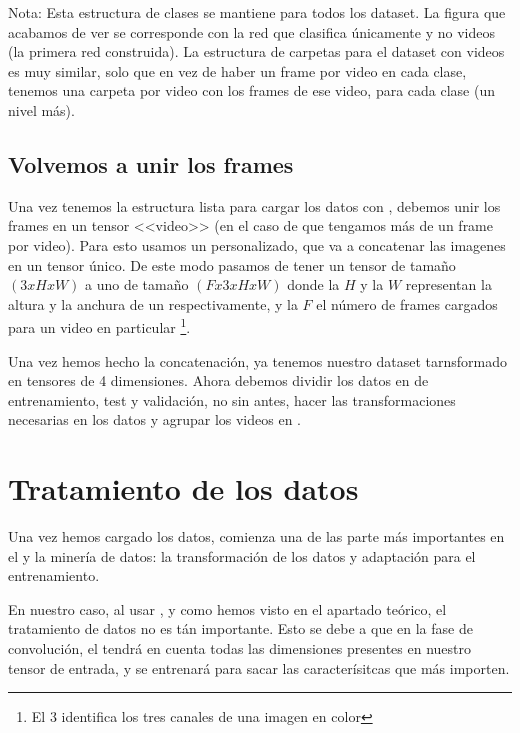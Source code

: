 Nota: Esta estructura de clases se mantiene para todos los dataset. La figura que acabamos de ver se corresponde con la red que clasifica únicamente  y no videos (la primera red construida). La estructura de carpetas para el dataset con videos es muy similar, solo que en vez de haber un frame por video en cada clase, tenemos una carpeta por video con los frames de ese video, para cada clase (un nivel más).

\subsection{Volvemos a unir los frames}

Una vez tenemos la estructura lista para cargar los datos con , debemos unir los frames en un tensor <<video>> (en el caso de que tengamos más de un frame por video). Para esto usamos un  personalizado, que va a concatenar las imagenes en un tensor único. De este modo pasamos de tener un tensor de tamaño $(3xHxW)$ a uno de tamaño $(Fx3xHxW)$ donde la $H$ y la $W$ representan la altura y la anchura de un  respectivamente, y la $F$ el número de frames cargados para un video en particular \footnote{El 3 identifica los tres canales  de una imagen en color}.

Una vez hemos hecho la concatenación, ya tenemos nuestro dataset tarnsformado en tensores de 4 dimensiones. Ahora debemos dividir los datos en  de entrenamiento, test y validación, no sin antes, hacer las transformaciones necesarias en los datos y agrupar los videos en .


\section{Tratamiento de los datos}

Una vez hemos cargado los datos, comienza una de las parte más importantes en el  y la minería de datos: la transformación de los datos y adaptación para el entrenamiento.

En nuestro caso, al usar , y como hemos visto en el apartado teórico, el tratamiento de datos no es tán importante. Esto se debe a que en la fase de convolución, el  tendrá en cuenta todas las dimensiones presentes en nuestro tensor de entrada, y se entrenará para sacar las caracterísitcas que más importen.

